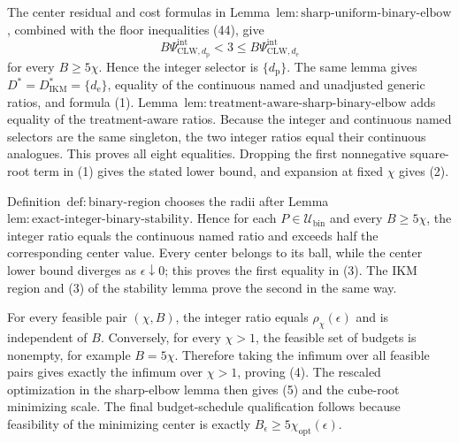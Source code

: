 The center residual and cost formulas in Lemma~\(\mathrm{lem{:}sharp\text{-}uniform\text{-}binary\text{-}elbow}\), combined with the floor inequalities (44), give
\[
 B\Psi_{\mathrm{CLW},d_{\mathrm p}}^{\mathrm{int}}<3
 \le B\Psi_{\mathrm{CLW},d_{\mathrm e}}^{\mathrm{int}}
\]
for every \(B\ge5\chi\).  Hence the integer selector is \(\{d_{\mathrm p}\}\).  The same lemma gives \(D^*=D_{\mathrm{IKM}}^*=\{d_{\mathrm e}\}\), equality of the continuous named and unadjusted generic ratios, and formula (1).  Lemma~\(\mathrm{lem{:}treatment\text{-}aware\text{-}sharp\text{-}binary\text{-}elbow}\) adds equality of the treatment-aware ratios.  Because the integer and continuous named selectors are the same singleton, the two integer ratios equal their continuous analogues.  This proves all eight equalities.  Dropping the first nonnegative square-root term in (1) gives the stated lower bound, and expansion at fixed \(\chi\) gives (2).

Definition~\(\mathrm{def{:}binary\text{-}region}\) chooses the radii after Lemma~\(\mathrm{lem{:}exact\text{-}integer\text{-}binary\text{-}stability}\).  Hence for each \(P\in\mathcal U_{\mathrm{bin}}\) and every \(B\ge5\chi\), the integer ratio equals the continuous named ratio and exceeds half the corresponding center value.  Every center belongs to its ball, while the center lower bound diverges as \(\epsilon\downarrow0\); this proves the first equality in (3).  The IKM region and (3) of the stability lemma prove the second in the same way.

For every feasible pair \((\chi,B)\), the integer ratio equals \(\rho_\chi(\epsilon)\) and is independent of \(B\).  Conversely, for every \(\chi>1\), the feasible set of budgets is nonempty, for example \(B=5\chi\).  Therefore taking the infimum over all feasible pairs gives exactly the infimum over \(\chi>1\), proving (4).  The rescaled optimization in the sharp-elbow lemma then gives (5) and the cube-root minimizing scale.  The final budget-schedule qualification follows because feasibility of the minimizing center is exactly \(B_\epsilon\ge5\chi_{\mathrm{opt}}(\epsilon)\).
